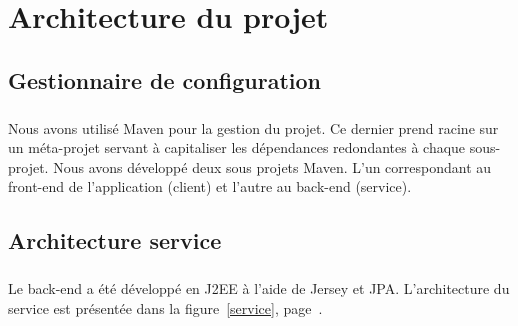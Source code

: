 \chapter{Architecture du projet}
\section{Gestionnaire de configuration}
\paragraph{}
Nous avons utilisé Maven pour la gestion du projet. Ce dernier prend racine sur un méta-projet servant à capitaliser les dépendances redondantes à chaque sous-projet. Nous avons développé deux sous projets Maven. L'un correspondant au front-end de l'application (client) et l'autre au back-end (service).

\section{Architecture service}
\paragraph{}
Le back-end a été développé en J2EE à l'aide de Jersey et JPA. L'architecture du service est présentée dans la figure~\ref{service}, page~\pageref{service}.

